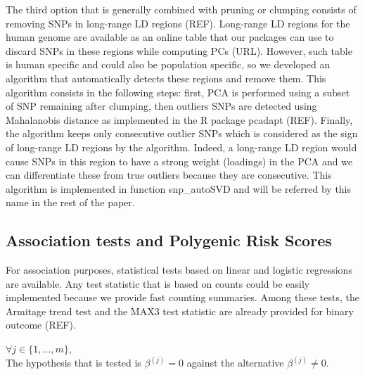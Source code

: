 \documentclass{bioinfo}
\begin{document}
\begin{methods}
The third option that is generally combined with pruning or clumping consists of removing SNPs in long-range LD regions (REF). Long-range LD regions for the human genome are available as an online table that our packages can use to discard SNPs in these regions while computing PCs (URL). However, such table is human specific and could also be population specific, so we developed an algorithm that automatically detects these regions and remove them. This algorithm consists in the following steps: first, PCA is performed using a subset of SNP remaining after clumping, then outliers SNPs are detected using Mahalanobis distance as implemented in the R package pcadapt (REF). Finally, the algorithm keeps only consecutive outlier SNPs which is considered as the sign of long-range LD regions by the algorithm. Indeed, a long-range LD region would cause SNPs in this region to have a strong weight (loadings) in the PCA and we can differentiate these from true outliers because they are consecutive. This algorithm is implemented in function snp\_autoSVD and will be referred by this name in the rest of the paper.


\subsection{Association tests and Polygenic Risk Scores}

For association purposes, statistical tests based on linear and logistic regressions are available. Any test statistic that is based on counts could be easily implemented because we provide fast counting summaries. Among these tests, the Armitage trend test and the MAX3 test statistic are already provided for binary outcome (REF). 

$\forall j \in \{1, \dots, m\}$, 
\\
The hypothesis that is tested is $\beta^{(j)} = 0$ against the alternative $\beta^{(j)} \neq 0$.


\end{methods}
\end{document}
